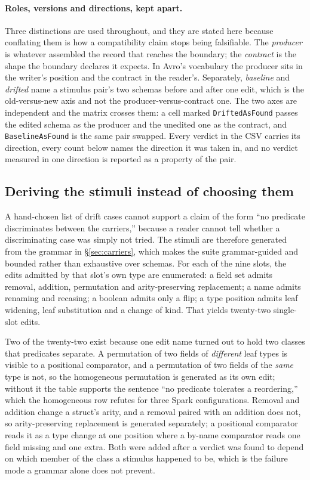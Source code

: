 \paragraph{Roles, versions and directions, kept apart.}
\label{sec:roles}
Three distinctions are used throughout, and they are stated here because conflating them is how a compatibility claim stops being falsifiable. The \emph{producer} is whatever assembled the record that reaches the boundary; the \emph{contract} is the shape the boundary declares it expects. In Avro's vocabulary the producer sits in the writer's position and the contract in the reader's. Separately, \emph{baseline} and \emph{drifted} name a stimulus pair's two schemas before and after one edit, which is the old-versus-new axis and not the producer-versus-contract one. The two axes are independent and the matrix crosses them: a cell marked \texttt{Drifted\allowbreak As\allowbreak Found} passes the edited schema as the producer and the unedited one as the contract, and \texttt{Baseline\allowbreak As\allowbreak Found} is the same pair swapped. Every verdict in the CSV carries its direction, every count below names the direction it was taken in, and no verdict measured in one direction is reported as a property of the pair.

\subsection{Deriving the stimuli instead of choosing them}

A hand-chosen list of drift cases cannot support a claim of the form ``no predicate discriminates between the carriers,'' because a reader cannot tell whether a discriminating case was simply not tried. The stimuli are therefore generated from the grammar in \S\ref{sec:carriers}, which makes the suite grammar-guided and bounded rather than exhaustive over schemas. For each of the nine slots, the edits admitted by that slot's own type are enumerated: a field set admits removal, addition, permutation and arity-preserving replacement; a name admits renaming and recasing; a boolean admits only a flip; a type position admits leaf widening, leaf substitution and a change of kind. That yields twenty-two single-slot edits.

Two of the twenty-two exist because one edit name turned out to hold two classes that predicates separate. A permutation of two fields of \emph{different} leaf types is visible to a positional comparator, and a permutation of two fields of the \emph{same} type is not, so the homogeneous permutation is generated as its own edit; without it the table supports the sentence ``no predicate tolerates a reordering,'' which the homogeneous row refutes for three Spark configurations. Removal and addition change a struct's arity, and a removal paired with an addition does not, so arity-preserving replacement is generated separately; a positional comparator reads it as a type change at one position where a by-name comparator reads one field missing and one extra. Both were added after a verdict was found to depend on which member of the class a stimulus happened to be, which is the failure mode a grammar alone does not prevent.

